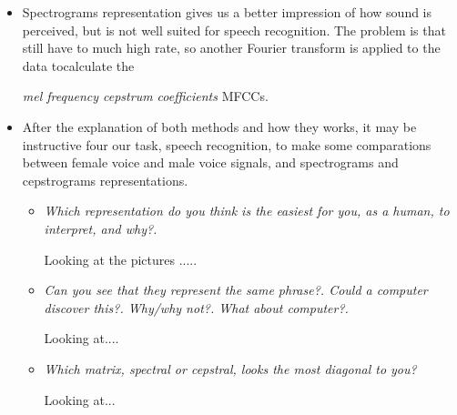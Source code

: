 \documentclass[a4paper]{article}
\begin{document}
\begin{itemize}
\begin{itemize}
			\vspace{2mm}
	        		\noindent

	\end{itemize}

	\begin{itemize}
		\item	Spectrograms representation gives us a better impression of how sound is perceived, but is not well suited for
			speech recognition. The problem is that still have to much high rate, so another Fourier transform is applied to 
			the data tocalculate the 

			\emph{mel frequency cepstrum coefficients} MFCCs.

	\end{itemize}

\end{itemize}

\begin{itemize}
	\item	After the explanation of both methods and how they works, it may be instructive four our task, speech recognition,
		to make some comparations between female voice and male voice signals, and spectrograms and cepstrograms representations.  

		\begin{itemize}
			\item 	\emph{Which representation do you think is the easiest for you, as a human, to interpret, and why?.}

			\vspace{2mm}
	        		\noindent
			
			Looking at the pictures .....
		\end{itemize}

		\begin{itemize}
			\item  	\emph {Can you see that they represent the same phrase?. Could a computer discover this?. 
				Why/why not?. What about computer?.}

			\vspace{2mm}
	        		\noindent

			Looking at....
		\end{itemize}

		\begin{itemize}
			\item 	\emph {Which matrix, spectral or cepstral, looks the most diagonal to you?}

			\vspace{2mm}
	        		\noindent

			Looking at...
		\end{itemize}
\end{itemize}
\end{document}
